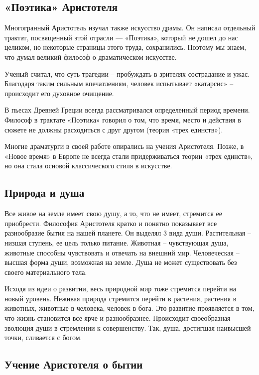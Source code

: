 \documentclass[a4paper, 14pt]{extreport}
\begin{document}
\subsection{«Поэтика» Аристотеля}

Многогранный Аристотель изучал также искусство драмы. Он написал
отдельный трактат, посвященный этой отрасли --- «Поэтика», который не
дошел до нас целиком, но некоторые страницы этого труда, сохранились.
Поэтому мы знаем, что думал великий философ о драматическом искусстве.

Ученый считал, что суть трагедии -- пробуждать в зрителях сострадание и
ужас. Благодаря таким сильным впечатлениям, человек испытывает
«катарсис» -- происходит его духовное очищение.

В пьесах Древней Греции всегда рассматривался определенный период
времени. Философ в трактате «Поэтика» говорил о том, что время, место и
действия в сюжете не должны расходиться с друг другом (теория «трех
единств»).

Многие драматурги в своей работе опирались на учения Аристотеля. Позже,
в «Новое время» в Европе не всегда стали придерживаться теории «трех
единств», но она стала основой классического стиля в искусстве.

\subsection{Природа и душа}

Все живое на земле имеет свою душу, а то, что не имеет, стремится ее
приобрести. Философия Аристотеля кратко и понятно показывает все
разнообразие бытия на нашей планете. Он выделял 3 вида души.
Растительная -- низшая ступень, ее цель только питание. Животная --
чувствующая душа, животные способны чувствовать и отвечать на внешний
мир. Человеческая -- высшая форма души, возможная на земле. Душа не
может существовать без своего материального тела.

Исходя из идеи о развитии, весь природной мир тоже стремится перейти на
новый уровень. Неживая природа стремится перейти в растения, растения в
животных, животные в человека, человек в бога. Это развитие проявляется
в том, что жизнь становится все ярче и разнообразнее. Происходит
своеобразная эволюция души в стремлении к совершенству. Так, душа,
достигшая наивысшей точки, сливается с богом.

\subsection{Учение Аристотеля о бытии}
\end{document}
